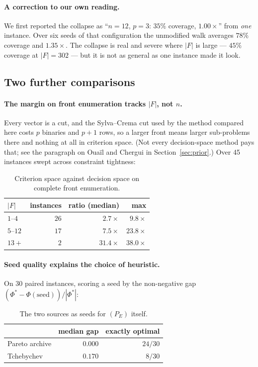 \documentclass[11pt,a4paper]{article}
\begin{document}
\paragraph{A correction to our own reading.}  We first reported the collapse
as ``$n=12$, $p=3$: $35\%$ coverage, $1.00\times$'' from \emph{one} instance.
Over six seeds of that configuration the unmodified walk averages $78\%$
coverage and $1.35\times$.  The collapse is real and severe where $|F|$ is
large --- $45\%$ coverage at $|F| = 302$ --- but it is not as general as one
instance made it look.

\subsection{Two further comparisons}

\paragraph{The margin on front enumeration tracks $|F|$, not $n$.}  Every
vector is a cut, and the Sylva--Crema cut used by the method compared here
costs $p$ binaries and $p+1$ rows, so a larger front means larger
sub-problems there and nothing at all in criterion space.  (Not every
decision-space method pays that; see the paragraph on Oua\"il and Chergui in
Section~\ref{sec:prior}.)  Over 45 instances swept across constraint tightness:

\begin{table}[h]
\centering
\caption{Criterion space against decision space on complete front enumeration.}
\begin{tabular}{lrrr}
\toprule
$|F|$ & instances & ratio (median) & max \\
\midrule
$1$--$4$  & $26$ & $2.7\times$  & $9.8\times$ \\
$5$--$12$ & $17$ & $7.5\times$  & $23.8\times$ \\
$13+$     & $2$  & $31.4\times$ & $38.0\times$ \\
\bottomrule
\end{tabular}
\end{table}

\paragraph{Seed quality explains the choice of heuristic.}  On 30 paired
instances, scoring a seed by the non-negative gap
$(\Phi^{*}-\Phi(\text{seed}))/|\Phi^{*}|$:

\begin{table}[h]
\centering
\caption{The two sources as seeds for $(P_E)$ itself.}
\begin{tabular}{lrr}
\toprule
 & median gap & exactly optimal \\
\midrule
Pareto archive & $0.000$ & $24/30$ \\
Tchebychev     & $0.170$ & $8/30$ \\
\bottomrule
\end{tabular}
\end{table}
\end{document}
